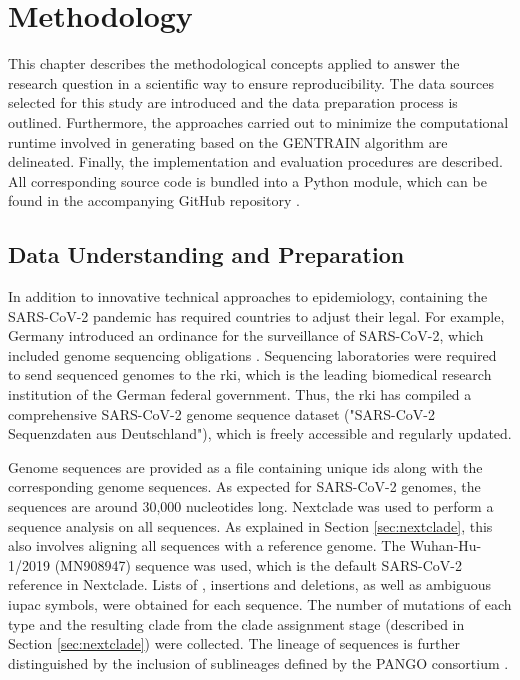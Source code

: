\section{Methodology}
\label{cha:methodology}
This chapter describes the methodological concepts applied to answer the research question in a scientific way to ensure reproducibility. The data sources selected for this study are introduced and the data preparation process is outlined. Furthermore, the approaches carried out to minimize the computational runtime involved in generating  based on the GENTRAIN algorithm are delineated. Finally, the implementation and evaluation procedures are described. All corresponding source code is bundled into a Python module, which can be found in the accompanying GitHub repository \cite{Git1}.

\subsection{Data Understanding and Preparation}
In addition to innovative technical approaches to epidemiology, containing the SARS-CoV-2 pandemic has required countries to adjust their legal. For example, Germany introduced an ordinance for the surveillance of SARS-CoV-2, which included genome sequencing obligations \cite{Bmg1}. Sequencing laboratories were required to send sequenced genomes to the \acrfull{rki}, which is the leading biomedical research institution of the German federal government.
Thus, the \acrshort{rki} has compiled a comprehensive SARS-CoV-2 genome sequence dataset ("SARS-CoV-2 Sequenzdaten aus Deutschland"), which is freely accessible and regularly updated. 

Genome sequences are provided as a file containing unique ids along with the corresponding genome sequences. As expected for SARS-CoV-2 genomes, the sequences are around 30,000 nucleotides long. Nextclade was used to perform a sequence analysis on all sequences. As explained in Section \ref{sec:nextclade}, this also involves aligning all sequences with a reference genome. The Wuhan-Hu-1/2019 (MN908947) sequence \cite{Wu1} was used, which is the default SARS-CoV-2 reference in Nextclade. Lists of , insertions and deletions, as well as ambiguous \acrshort{iupac} symbols, were obtained for each sequence. The number of mutations of each type and the resulting clade from the clade assignment stage (described in Section \ref{sec:nextclade}) were collected. The lineage of sequences is further distinguished by the inclusion of sublineages defined by the PANGO consortium \cite{Pan1}.

